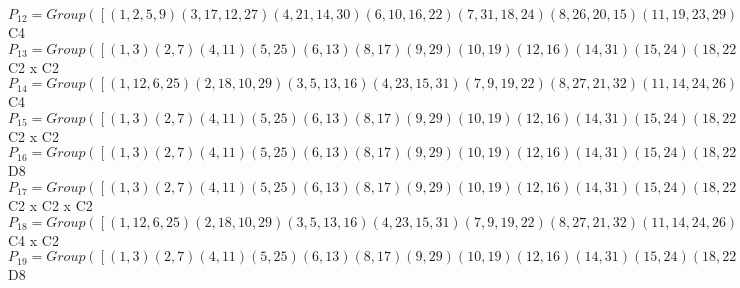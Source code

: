 \documentclass[varwidth=\maxdimen,border=10]{standalone}
\begin{document}
\begin{tabular}
$P_{12} = Group( [ ( 1, 2, 5, 9)( 3,17,12,27)( 4,21,14,30)( 6,10,16,22)( 7,31,18,24)( 8,26,20,15)(11,19,23,29)(13,28,25,32), ( 1, 5)( 2, 9)( 3,12)( 4,14)( 6,16)( 7,18)( 8,20)(10,22)(11,23)(13,25)(15,26)(17,27)(19,29)(21,30)(24,31)(28,32) ] )\cong$ C4\ \\
$P_{13} = Group( [ ( 1, 3)( 2, 7)( 4,11)( 5,25)( 6,13)( 8,17)( 9,29)(10,19)(12,16)(14,31)(15,24)(18,22)(20,32)(21,28)(23,26)(27,30), ( 1, 6)( 2,10)( 3,13)( 4,15)( 5,16)( 7,19)( 8,21)( 9,22)(11,24)(12,25)(14,26)(17,28)(18,29)(20,30)(23,31)(27,32) ] )\cong$ C2 x C2\ \\
$P_{14} = Group( [ ( 1,12, 6,25)( 2,18,10,29)( 3, 5,13,16)( 4,23,15,31)( 7, 9,19,22)( 8,27,21,32)(11,14,24,26)(17,20,28,30), ( 1, 6)( 2,10)( 3,13)( 4,15)( 5,16)( 7,19)( 8,21)( 9,22)(11,24)(12,25)(14,26)(17,28)(18,29)(20,30)(23,31)(27,32) ] )\cong$ C4\ \\
$P_{15} = Group( [ ( 1, 3)( 2, 7)( 4,11)( 5,25)( 6,13)( 8,17)( 9,29)(10,19)(12,16)(14,31)(15,24)(18,22)(20,32)(21,28)(23,26)(27,30), ( 1, 4)( 2, 8)( 3,11)( 5,14)( 6,15)( 7,17)( 9,20)(10,21)(12,23)(13,24)(16,26)(18,27)(19,28)(22,30)(25,31)(29,32) ] )\cong$ C2 x C2\ \\
$P_{16} = Group( [ ( 1, 3)( 2, 7)( 4,11)( 5,25)( 6,13)( 8,17)( 9,29)(10,19)(12,16)(14,31)(15,24)(18,22)(20,32)(21,28)(23,26)(27,30), ( 1, 5)( 2, 9)( 3,12)( 4,14)( 6,16)( 7,18)( 8,20)(10,22)(11,23)(13,25)(15,26)(17,27)(19,29)(21,30)(24,31)(28,32), ( 1, 6)( 2,10)( 3,13)( 4,15)( 5,16)( 7,19)( 8,21)( 9,22)(11,24)(12,25)(14,26)(17,28)(18,29)(20,30)(23,31)(27,32) ] )\cong$ D8\ \\
$P_{17} = Group( [ ( 1, 3)( 2, 7)( 4,11)( 5,25)( 6,13)( 8,17)( 9,29)(10,19)(12,16)(14,31)(15,24)(18,22)(20,32)(21,28)(23,26)(27,30), ( 1, 4)( 2, 8)( 3,11)( 5,14)( 6,15)( 7,17)( 9,20)(10,21)(12,23)(13,24)(16,26)(18,27)(19,28)(22,30)(25,31)(29,32), ( 1, 6)( 2,10)( 3,13)( 4,15)( 5,16)( 7,19)( 8,21)( 9,22)(11,24)(12,25)(14,26)(17,28)(18,29)(20,30)(23,31)(27,32) ] )\cong$ C2 x C2 x C2\ \\
$P_{18} = Group( [ ( 1,12, 6,25)( 2,18,10,29)( 3, 5,13,16)( 4,23,15,31)( 7, 9,19,22)( 8,27,21,32)(11,14,24,26)(17,20,28,30), ( 1, 4)( 2, 8)( 3,11)( 5,14)( 6,15)( 7,17)( 9,20)(10,21)(12,23)(13,24)(16,26)(18,27)(19,28)(22,30)(25,31)(29,32), ( 1, 6)( 2,10)( 3,13)( 4,15)( 5,16)( 7,19)( 8,21)( 9,22)(11,24)(12,25)(14,26)(17,28)(18,29)(20,30)(23,31)(27,32) ] )\cong$ C4 x C2\ \\
$P_{19} = Group( [ ( 1, 3)( 2, 7)( 4,11)( 5,25)( 6,13)( 8,17)( 9,29)(10,19)(12,16)(14,31)(15,24)(18,22)(20,32)(21,28)(23,26)(27,30), ( 1,14)( 2,20)( 3,23)( 4, 5)( 6,26)( 7,27)( 8, 9)(10,30)(11,12)(13,31)(15,16)(17,18)(19,32)(21,22)(24,25)(28,29), ( 1, 6)( 2,10)( 3,13)( 4,15)( 5,16)( 7,19)( 8,21)( 9,22)(11,24)(12,25)(14,26)(17,28)(18,29)(20,30)(23,31)(27,32) ] )\cong$ D8\ \\

\end{tabular}
\end{document}
